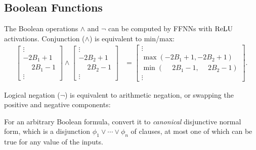     \subsection{Boolean Functions}
    The Boolean operations $\land$ and $\lnot$ can be computed by FFNNs with $\text{ReLU}$ activations. Conjunction ($\land$) is equivalent to min/max:
  \begin{align*}
  \begin{bmatrix} \vdots \\ -2B_1+1 \\ \phantom{-}2B_1-1 \\ \vdots \end{bmatrix} \land \begin{bmatrix} \vdots \\ -2B_2+1 \\ \phantom{-}2B_2-1 \\ \vdots \end{bmatrix} &= \begin{bmatrix} \vdots \\ \max(-2B_1+1,-2B_2+1) \\ \min(\phantom{-}2B_1-1,\phantom{-}2B_2-1) \\ \vdots \end{bmatrix}.
  \end{align*}

  Logical negation ($\lnot$) is equivalent to arithmetic negation, or swapping the positive and negative components:
  \begin{center}
  \end{center}

    For an arbitrary Boolean formula, convert it to \emph{canonical} disjunctive normal form, which is a disjunction $\phi_1 \lor \cdots \lor \phi_n$ of clauses, at most one of which can be true for any value of the inputs. 

